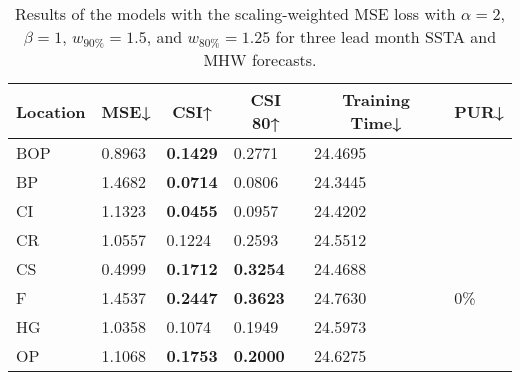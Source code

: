 \documentclass[11pt, a4paper]{article}
\begin{document}
\begin{table}[H]
\centering
\small
\caption{Results of the models with the scaling-weighted MSE loss with $\alpha=2$, $\beta=1$, $w_{90\%}=1.5$, and $w_{80\%}=1.25$ for three lead month SSTA and MHW forecasts.}
\begin{tabular}{llllll}
\multicolumn{1}{c}{\textbf{Location}} & \multicolumn{1}{c}{\textbf{MSE↓}} & \multicolumn{1}{c}{\textbf{CSI↑}} & \multicolumn{1}{c}{\textbf{CSI 80↑}} & \multicolumn{1}{c}{\textbf{Training Time↓}} & \multicolumn{1}{c}{\textbf{PUR↓}} \\ \hline
BOP                         & 0.8963                            & \textbf{0.1429}                   & 0.2771                               & 24.4695                                     &                                   \\
BP                        & 1.4682                            & \textbf{0.0714}                   & 0.0806                               & 24.3445                                     &                                   \\
CI                        & 1.1323                            & \textbf{0.0455}                   & 0.0957                               & 24.4202                                     &                                   \\
CR                           & 1.0557                            & 0.1224                            & 0.2593                               & 24.5512                                     &                                   \\
CS                           & 0.4999                            & \textbf{0.1712}                   & \textbf{0.3254}                      & 24.4688                                     &                                   \\
F                             & 1.4537                            & \textbf{0.2447}                   & \textbf{0.3623}                      & 24.7630                                     & 0\%                               \\
HG                          & 1.0358                            & 0.1074                            & 0.1949                               & 24.5973                                     &                                   \\
OP                       & 1.1068                            & \textbf{0.1753}                   & \textbf{0.2000}                      & 24.6275                                     &                                   \\

\end{tabular}
\end{table}
\end{document}
